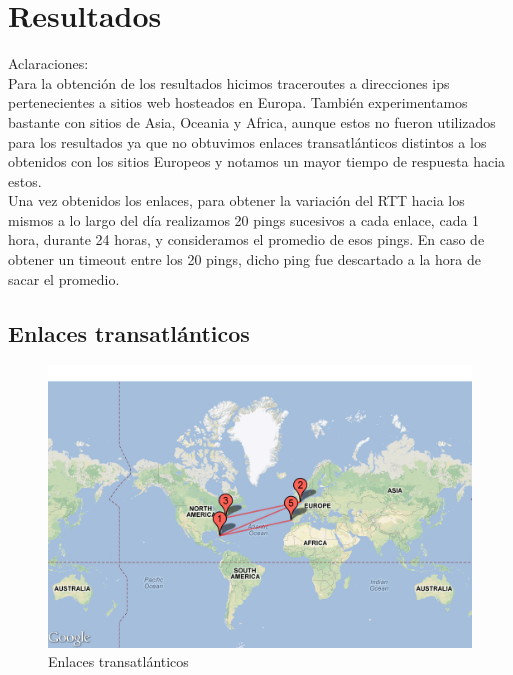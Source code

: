 \section{Resultados}

Aclaraciones:	\\
\indent	Para la obtención de los resultados hicimos traceroutes a direcciones ips pertenecientes a sitios web hosteados en Europa. También experimentamos bastante con sitios de Asia, Oceania y Africa, aunque estos no fueron utilizados para los resultados ya que no obtuvimos enlaces transatlánticos distintos a los obtenidos con los sitios Europeos y notamos un mayor tiempo de respuesta hacia estos.	\\
\indent	Una vez obtenidos los enlaces, para obtener la variación del RTT hacia los mismos a lo largo del día realizamos 20 pings sucesivos a cada enlace, cada 1 hora, durante 24 horas, y consideramos el promedio de esos pings. En caso de obtener un timeout entre los 20 pings, dicho ping fue descartado a la hora de sacar el promedio.

\subsection{Enlaces transatlánticos}



\begin{figure}[H]
\begin{center}
\includegraphics[width=17cm]{enlaces.png}
\end{center}
\caption{Enlaces transatlánticos} \label{figura1}
\end{figure}

